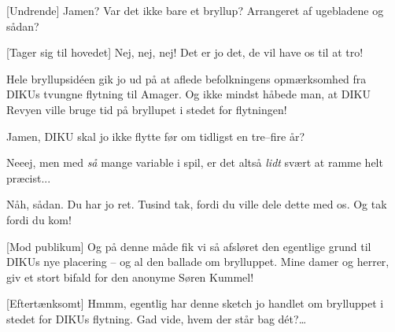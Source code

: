 \documentclass[a4paper,11pt]{article}
\begin{document}
\begin{sketch}
[Undrende] Jamen? Var det ikke bare et bryllup? Arrangeret af ugebladene
og sådan?

[Tager sig til hovedet] Nej, nej, nej! Det er jo det, de vil have os
til at tro! 

Hele bryllupsidéen gik jo ud på at aflede befolkningens opmærksomhed fra DIKUs
tvungne flytning til Amager. Og ikke mindst håbede man, at DIKU Revyen ville
bruge tid på bryllupet i stedet for flytningen!

Jamen, DIKU skal jo ikke flytte før om tidligst en tre--fire år?

Neeej, men med {\em så} mange variable i spil, er det altså {\em
lidt} svært at ramme helt præcist...

 Nåh, sådan. Du har jo ret. Tusind tak, fordi du ville dele dette med
os. Og tak fordi du kom!


[Mod publikum] Og på denne måde fik vi så afsløret den egentlige grund
til DIKUs nye placering -- og al den ballade om brylluppet. Mine damer og
herrer, giv et stort bifald for den anonyme Søren Kummel!



[Eftertænksomt] Hmmm, egentlig har denne sketch jo handlet om
brylluppet i stedet for DIKUs flytning. Gad vide, hvem der står bag dét?\ldots


\end{sketch}
\end{document}
